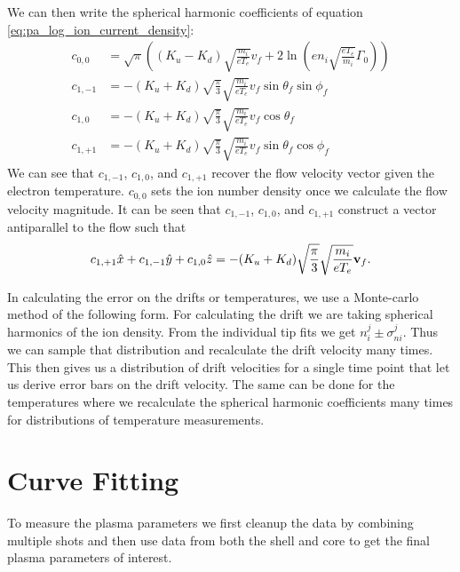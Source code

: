 We can then write the spherical harmonic coefficients of equation \ref{eq:pa_log_ion_current_density}:
\begin{align*}
    c_{0,0} &= \sqrt{\pi} \left((K_u - K_d) \sqrt{\frac{m_i}{e T_e}} v_f + 2 \ln\left(e n_i \sqrt{\frac{e T_e}{m_i}} \Gamma_0\right)\right) \\
    c_{1,-1} &= -(K_u + K_d) \sqrt{\frac{\pi}{3}}\sqrt{\frac{m_i}{e T_e}} v_f \sin \theta_f \sin \phi_f \\
    c_{1,0} &= -(K_u + K_d) \sqrt{\frac{\pi}{3}}\sqrt{\frac{m_i}{e T_e}} v_f \cos \theta_f \\
    c_{1,+1} &= -(K_u + K_d) \sqrt{\frac{\pi}{3}}\sqrt{\frac{m_i}{e T_e}} v_f \sin \theta_f \cos \phi_f
\end{align*}
We can see that $c_{1,-1}$, $c_{1,0}$, and $c_{1,+1}$ recover the flow velocity vector given the electron temperature. $c_{0,0}$ sets the ion number density once we calculate the flow velocity magnitude. It can be seen that $c_{1,-1}$, $c_{1,0}$, and $c_{1,+1}$ construct a vector antiparallel to the flow such that
\begin{equation*}
    c_{1,+1} \hat{x} + c_{1,-1} \hat{y} + c_{1,0} \hat{z} = -(K_u + K_d) \sqrt{\frac{\pi}{3}}\sqrt{\frac{m_i}{e T_e}} \vb{v}_f.
\end{equation*}


In calculating the error on the drifts or temperatures, we use a Monte-carlo method of the following form. For calculating the drift we are taking spherical harmonics of the ion density. From the individual tip fits we get $n_i^j \pm \sigma_{ni}^j$. Thus we can sample that distribution and recalculate the drift velocity many times. This then gives us a distribution of drift velocities for a single time point that let us derive error bars on the drift velocity. The same can be done for the temperatures where we recalculate the spherical harmonic coefficients many times for distributions of temperature measurements.

\section{Curve Fitting}

To measure the plasma parameters we first cleanup the data by combining multiple shots and then use data from both the shell and core to get the final plasma parameters of interest.


